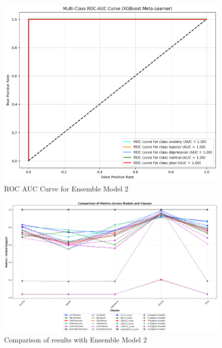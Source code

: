 \begin{figure}[h!]  
    \centering
    \includegraphics[width=1.0\textwidth]{Images/EM4 ROC.png}  
    \caption{ROC AUC Curve for Ensemble Model 2}
    \label{dfdl1244883}  %
\end{figure}

\begin{figure}[h!]  
    \centering
    \includegraphics[width=1.0\textwidth]{Images/EM4 RESULT.png}  
    \caption{Comparison of results with Ensemble Model 2}
    \label{dfdl1244883}  %
\end{figure}


